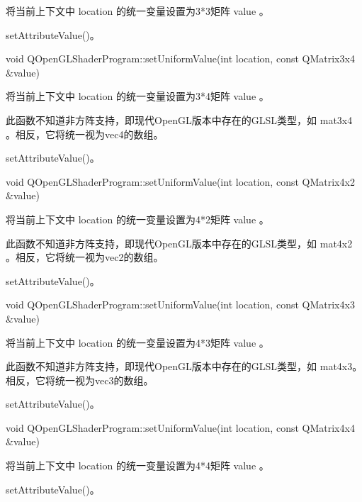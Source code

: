 将当前上下文中 location 的统一变量设置为3*3矩阵 value 。

\begin{seeAlso}
setAttributeValue()。
\end{seeAlso}

void QOpenGLShaderProgram::setUniformValue(int location, const QMatrix3x4 \&value)

将当前上下文中 location 的统一变量设置为3*4矩阵 value 。

\begin{notice}
此函数不知道非方阵支持，即现代OpenGL版本中存在的GLSL类型，如 mat3x4 。相反，它将统一视为vec4的数组。
\end{notice}

\begin{seeAlso}
setAttributeValue()。
\end{seeAlso}

void QOpenGLShaderProgram::setUniformValue(int location, const QMatrix4x2 \&value)

将当前上下文中 location 的统一变量设置为4*2矩阵 value 。

\begin{notice}
此函数不知道非方阵支持，即现代OpenGL版本中存在的GLSL类型，如 mat4x2 。相反，它将统一视为vec2的数组。
\end{notice}

\begin{seeAlso}
setAttributeValue()。
\end{seeAlso}

void QOpenGLShaderProgram::setUniformValue(int location, const QMatrix4x3 \&value)

将当前上下文中 location 的统一变量设置为4*3矩阵 value 。

\begin{notice}
此函数不知道非方阵支持，即现代OpenGL版本中存在的GLSL类型，如 mat4x3。相反，它将统一视为vec3的数组。
\end{notice}

\begin{seeAlso}
setAttributeValue()。
\end{seeAlso}

void QOpenGLShaderProgram::setUniformValue(int location, const QMatrix4x4 \&value)

将当前上下文中 location 的统一变量设置为4*4矩阵 value 。

\begin{seeAlso}
setAttributeValue()。
\end{seeAlso}


